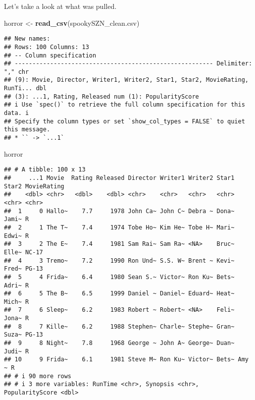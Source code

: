 \documentclass[
]{article}
\newenvironment{Shaded}{\begin{snugshade}}{\end{snugshade}}
\newcommand{\FunctionTok}[1]{\textcolor[rgb]{0.13,0.29,0.53}{\textbf{#1}}}
\newcommand{\NormalTok}[1]{#1}
\newcommand{\OtherTok}[1]{\textcolor[rgb]{0.56,0.35,0.01}{#1}}
\newcommand{\StringTok}[1]{\textcolor[rgb]{0.31,0.60,0.02}{#1}}
\begin{document}
Let's take a look at what was pulled.

\begin{Shaded}
\begin{Highlighting}[]
\NormalTok{horror }\OtherTok{\textless{}{-}} \FunctionTok{read\_csv}\NormalTok{(}\StringTok{\textquotesingle{}spookySZN\_clean.csv\textquotesingle{}}\NormalTok{)}
\end{Highlighting}
\end{Shaded}

\begin{verbatim}
## New names:
## Rows: 100 Columns: 13
## -- Column specification
## -------------------------------------------------------- Delimiter: "," chr
## (9): Movie, Director, Writer1, Writer2, Star1, Star2, MovieRating, RunTi... dbl
## (3): ...1, Rating, Released num (1): PopularityScore
## i Use `spec()` to retrieve the full column specification for this data. i
## Specify the column types or set `show_col_types = FALSE` to quiet this message.
## * `` -> `...1`
\end{verbatim}

\begin{Shaded}
\begin{Highlighting}[]
\NormalTok{horror}
\end{Highlighting}
\end{Shaded}

\begin{verbatim}
## # A tibble: 100 x 13
##     ...1 Movie  Rating Released Director Writer1 Writer2 Star1 Star2 MovieRating
##    <dbl> <chr>   <dbl>    <dbl> <chr>    <chr>   <chr>   <chr> <chr> <chr>      
##  1     0 Hallo~    7.7     1978 John Ca~ John C~ Debra ~ Dona~ Jami~ R          
##  2     1 The T~    7.4     1974 Tobe Ho~ Kim He~ Tobe H~ Mari~ Edwi~ R          
##  3     2 The E~    7.4     1981 Sam Rai~ Sam Ra~ <NA>    Bruc~ Elle~ NC-17      
##  4     3 Tremo~    7.2     1990 Ron Und~ S.S. W~ Brent ~ Kevi~ Fred~ PG-13      
##  5     4 Frida~    6.4     1980 Sean S.~ Victor~ Ron Ku~ Bets~ Adri~ R          
##  6     5 The B~    6.5     1999 Daniel ~ Daniel~ Eduard~ Heat~ Mich~ R          
##  7     6 Sleep~    6.2     1983 Robert ~ Robert~ <NA>    Feli~ Jona~ R          
##  8     7 Kille~    6.2     1988 Stephen~ Charle~ Stephe~ Gran~ Suza~ PG-13      
##  9     8 Night~    7.8     1968 George ~ John A~ George~ Duan~ Judi~ R          
## 10     9 Frida~    6.1     1981 Steve M~ Ron Ku~ Victor~ Bets~ Amy ~ R          
## # i 90 more rows
## # i 3 more variables: RunTime <chr>, Synopsis <chr>, PopularityScore <dbl>
\end{verbatim}
\end{document}
